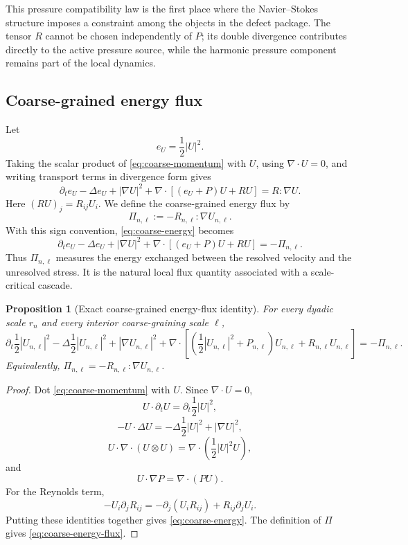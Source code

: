 \documentclass[11pt]{article}
\numberwithin{equation}{section}
\theoremstyle{plain}
\newtheorem{proposition}[theorem]{Proposition}
\theoremstyle{definition}
\theoremstyle{remark}
\begin{document}
This pressure compatibility law is the first place where the Navier--Stokes structure imposes a constraint among the objects in the defect package.  The tensor \(R\) cannot be chosen independently of \(P\); its double divergence contributes directly to the active pressure source, while the harmonic pressure component remains part of the local dynamics.
\subsection{Coarse-grained energy flux}

Let
\[
  e_U=\frac12|U|^2.
\]
Taking the scalar product of \eqref{eq:coarse-momentum} with \(U\), using \(\nabla\cdot U=0\), and writing transport terms in divergence form gives
\begin{equation}
  \partial_t e_U
  -\Delta e_U
  +|\nabla U|^2
  +
  \nabla\cdot
  \left[
    (e_U+P)U+RU
  \right]
  =
  R:\nabla U.
  \label{eq:coarse-energy}
\end{equation}
Here \((RU)_j=R_{ij}U_i\).  We define the coarse-grained energy flux by
\begin{equation}
  \Pi_{n,\ell}
  :=
  -R_{n,\ell}:\nabla U_{n,\ell}.
  \label{eq:energy-flux}
\end{equation}
With this sign convention, \eqref{eq:coarse-energy} becomes
\begin{equation}
  \partial_t e_U
  -\Delta e_U
  +|\nabla U|^2
  +
  \nabla\cdot
  \left[
    (e_U+P)U+RU
  \right]
  =
  -\Pi_{n,\ell}.
  \label{eq:coarse-energy-flux}
\end{equation}
Thus \(\Pi_{n,\ell}\) measures the energy exchanged between the resolved velocity and the unresolved stress.  It is the natural local flux quantity associated with a scale-critical cascade.

\begin{proposition}[Exact coarse-grained energy-flux identity]
For every dyadic scale \(r_n\) and every interior coarse-graining scale \(\ell\),
\[
  \partial_t \frac12|U_{n,\ell}|^2
  -\Delta \frac12|U_{n,\ell}|^2
  +|\nabla U_{n,\ell}|^2
  +
  \nabla\cdot
  \left[
  \left(\frac12|U_{n,\ell}|^2+P_{n,\ell}\right)U_{n,\ell}
  +R_{n,\ell}U_{n,\ell}
  \right]
  =
  -\Pi_{n,\ell}.
\]
Equivalently, \(\Pi_{n,\ell}=-R_{n,\ell}:\nabla U_{n,\ell}\).
\end{proposition}

\begin{proof}
Dot \eqref{eq:coarse-momentum} with \(U\).  Since \(\nabla\cdot U=0\),
\[
  U\cdot\partial_tU=\partial_t\frac12|U|^2,
\]
\[
  -U\cdot\Delta U=-\Delta\frac12|U|^2+|\nabla U|^2,
\]
\[
  U\cdot\nabla\cdot(U\otimes U)=
  \nabla\cdot\left(\frac12|U|^2U\right),
\]
and
\[
  U\cdot\nabla P=\nabla\cdot(PU).
\]
For the Reynolds term,
\[
  -U_i\partial_jR_{ij}
  =
  -\partial_j(U_iR_{ij})+R_{ij}\partial_jU_i.
\]
Putting these identities together gives \eqref{eq:coarse-energy}.  The definition of \(\Pi\) gives \eqref{eq:coarse-energy-flux}.
\end{proof}
\end{document}
